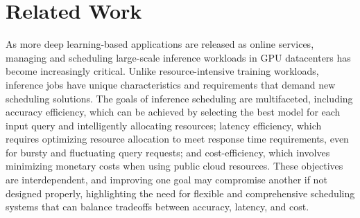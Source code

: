 \section{Related Work}\label{sec:related}

As more deep learning-based applications are released as online services, managing and scheduling large-scale inference workloads in GPU datacenters has become increasingly critical. Unlike resource-intensive training workloads, inference jobs have unique characteristics and requirements that demand new scheduling solutions. The goals of inference scheduling are multifaceted, including accuracy efficiency, which can be achieved by selecting the best model for each input query and intelligently allocating resources; latency efficiency, which requires optimizing resource allocation to meet response time requirements, even for bursty and fluctuating query requests; and cost-efficiency, which involves minimizing monetary costs when using public cloud resources. These objectives are interdependent, and improving one goal may compromise another if not designed properly, highlighting the need for flexible and comprehensive scheduling systems that can balance tradeoffs between accuracy, latency, and cost.

